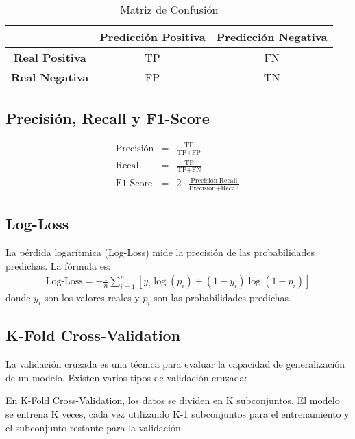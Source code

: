 \documentclass[a4paper]{report} %
\begin{document}
\begin{table}[h]
\centering
\begin{tabular}{|c|c|c|}
\hline
 & \textbf{Predicci\'on Positiva} & \textbf{Predicci\'on Negativa} \\
\hline
\textbf{Real Positiva} & TP & FN \\
\hline
\textbf{Real Negativa} & FP & TN \\
\hline
\end{tabular}
\caption{Matriz de Confusi\'on}
\label{tab:confusion_matrix}
\end{table}
\subsection{Precisi\'on, Recall y F1-Score}
\begin{eqnarray*}
\text{Precisi\'on} &=& \frac{\text{TP}}{\text{TP} + \text{FP}} \\
\text{Recall} &=& \frac{\text{TP}}{\text{TP} + \text{FN}} \\
\text{F1-Score} &=& 2 \cdot \frac{\text{Precisi\'on} \cdot \text{Recall}}{\text{Precisi\'on} + \text{Recall}}
\end{eqnarray*}
\subsection{Log-Loss}
La p\'erdida logar\'itmica (Log-Loss) mide la precisi\'on de las probabilidades predichas. La f\'ormula es:
\begin{eqnarray*}
\text{Log-Loss} = -\frac{1}{n} \sum_{i=1}^{n} \left[ y_i \log(p_i) + (1 - y_i) \log(1 - p_i) \right]
\end{eqnarray*}
donde $y_i$ son los valores reales y $p_i$ son las probabilidades predichas.
\subsection{K-Fold Cross-Validation}
La validaci\'on cruzada es una t\'ecnica para evaluar la capacidad de generalizaci\'on de un modelo. Existen varios tipos de validaci\'on cruzada:


En K-Fold Cross-Validation, los datos se dividen en K subconjuntos. El modelo se entrena K veces, cada vez utilizando K-1 subconjuntos para el entrenamiento y el subconjunto restante para la validaci\'on.
\end{document}
